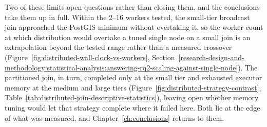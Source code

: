 Two of these limits open questions rather than closing them, and the conclusions take them up in full. Within the \numrange{2}{16} workers tested, the small-tier broadcast join approached the PostGIS minimum without overtaking it, so the worker count at which distribution would overtake a tuned single node on a small join is an extrapolation beyond the tested range rather than a measured crossover (Figure~\ref{fig:distributed-wall-clock-vs-workers}, Section~\ref{research-design-and-methodology:statistical-analysis:answering-rq2-scaling-against-single-node}). The partitioned join, in turn, completed only at the small tier and exhausted executor memory at the medium and large tiers (Figure~\ref{fig:distributed-strategy-contrast}, Table~\ref{tab:distributed-join-descriptive-statistics}), leaving open whether memory tuning would let that strategy complete where it failed here. Both lie at the edge of what was measured, and Chapter~\ref{ch:conclusions} returns to them.